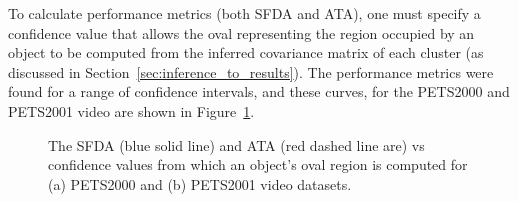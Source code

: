 \documentclass[smallcondensed, final]{svjour3}
\begin{document}
To calculate performance metrics (both SFDA and ATA), one must specify a confidence value that allows the oval representing the region occupied by an object to be computed from the inferred covariance matrix of each cluster (as discussed in Section~\ref{sec:inference_to_results}). The performance metrics were found for a range of confidence intervals, and these curves, for the PETS2000 and PETS2001 video are shown in Figure~\ref{fig:pm_conf}.


\begin{figure}[h]
  \centering             
  \caption{The SFDA (blue solid line) and ATA (red dashed line are) vs  confidence values from which an object's oval region is computed for (a) PETS2000 and (b) PETS2001 video datasets.}
  \label{fig:pm_conf}
\end{figure}
\end{document}
